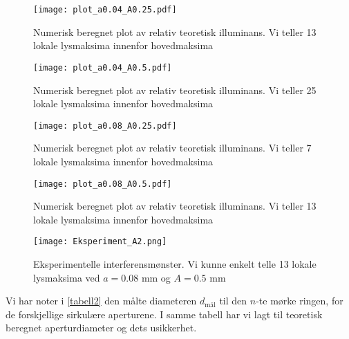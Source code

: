 \documentclass[reprint,norsk,notitlepage,floatfix]{revtex4-2}
\begin{document}
    \begin{figure}[h!]
      \centering
      \texttt{[image: plot\_a0.04\_A0.25.pdf]}
      \caption{Numerisk beregnet plot av relativ teoretisk illuminans. Vi teller 13 lokale lysmaksima innenfor hovedmaksima}
      \label{fig: a4A25}
    \end{figure}
    
    \begin{figure}[h!]
      \centering
      \texttt{[image: plot\_a0.04\_A0.5.pdf]}
      \caption{Numerisk beregnet plot av relativ teoretisk illuminans. Vi teller 25 lokale lysmaksima innenfor hovedmaksima}
      \label{fig: a4A50}
    \end{figure}
    
    \begin{figure}[h!]
      \centering
      \texttt{[image: plot\_a0.08\_A0.25.pdf]}
      \caption{Numerisk beregnet plot av relativ teoretisk illuminans. Vi teller 7 lokale lysmaksima innenfor hovedmaksima}
      \label{fig: a8A25}
    \end{figure}
    
    \begin{figure}[h!]
      \centering
      \texttt{[image: plot\_a0.08\_A0.5.pdf]}
      \caption{Numerisk beregnet plot av relativ teoretisk illuminans. Vi teller 13 lokale lysmaksima innenfor hovedmaksima}
      \label{fig: a8A50}
    \end{figure}
    
    \begin{figure}[h!]
      \centering
      \texttt{[image: Eksperiment\_A2.png]}
      \caption{Eksperimentelle interferensmønster. Vi kunne enkelt telle 13 lokale lysmaksima ved $a=0.08$ mm og $A = 0.5$ mm}
      \label{fig: Eksperiment_A2}
    \end{figure}
    
    
    Vi har noter i \cref{tabell2} den målte diameteren $d_{\text{mål}}$ til den $n$-te mørke ringen, for de forskjellige sirkulære aperturene. I samme tabell har vi lagt til teoretisk beregnet aperturdiameter og dets usikkerhet. 
    
\end{document}
